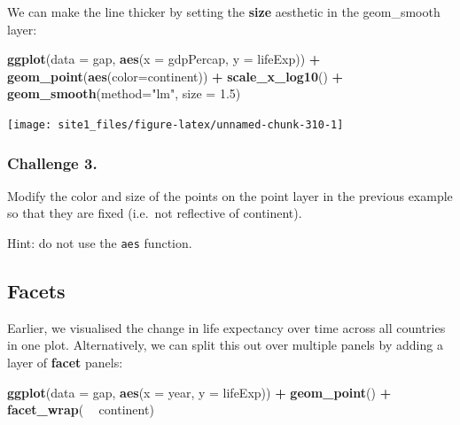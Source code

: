 \documentclass[]{book}
\newenvironment{Shaded}{\begin{snugshade}}{\end{snugshade}}
\newcommand{\DataTypeTok}[1]{\textcolor[rgb]{0.13,0.29,0.53}{#1}}
\newcommand{\FloatTok}[1]{\textcolor[rgb]{0.00,0.00,0.81}{#1}}
\newcommand{\KeywordTok}[1]{\textcolor[rgb]{0.13,0.29,0.53}{\textbf{#1}}}
\newcommand{\NormalTok}[1]{#1}
\newcommand{\OperatorTok}[1]{\textcolor[rgb]{0.81,0.36,0.00}{\textbf{#1}}}
\newcommand{\StringTok}[1]{\textcolor[rgb]{0.31,0.60,0.02}{#1}}
\begin{document}
We can make the line thicker by setting the \textbf{size} aesthetic in the geom\_smooth layer:

\begin{Shaded}
\begin{Highlighting}[]
\KeywordTok{ggplot}\NormalTok{(}\DataTypeTok{data =}\NormalTok{ gap, }\KeywordTok{aes}\NormalTok{(}\DataTypeTok{x =}\NormalTok{ gdpPercap, }\DataTypeTok{y =}\NormalTok{ lifeExp)) }\OperatorTok{+}\StringTok{ }
\StringTok{  }\KeywordTok{geom_point}\NormalTok{(}\KeywordTok{aes}\NormalTok{(}\DataTypeTok{color=}\NormalTok{continent)) }\OperatorTok{+}\StringTok{ }
\StringTok{  }\KeywordTok{scale_x_log10}\NormalTok{() }\OperatorTok{+}\StringTok{ }
\StringTok{  }\KeywordTok{geom_smooth}\NormalTok{(}\DataTypeTok{method=}\StringTok{"lm"}\NormalTok{, }\DataTypeTok{size =} \FloatTok{1.5}\NormalTok{)}
\end{Highlighting}
\end{Shaded}

\begin{center}\texttt{[image: site1\_files/figure-latex/unnamed-chunk-310-1]} \end{center}

\hypertarget{challenge-3.-5}{%
\subsubsection*{Challenge 3.}\label{challenge-3.-5}}

Modify the color and size of the points on the point layer in the previous example so that they are fixed (i.e.~not reflective of continent).

Hint: do not use the \texttt{aes} function.

\hypertarget{facets}{%
\subsection{Facets}\label{facets}}

Earlier, we visualised the change in life expectancy over time across all countries in one plot. Alternatively, we can split this out over multiple panels by adding a layer of \textbf{facet} panels:

\begin{Shaded}
\begin{Highlighting}[]
\KeywordTok{ggplot}\NormalTok{(}\DataTypeTok{data =}\NormalTok{ gap, }\KeywordTok{aes}\NormalTok{(}\DataTypeTok{x =}\NormalTok{ year, }\DataTypeTok{y =}\NormalTok{ lifeExp)) }\OperatorTok{+}
\StringTok{  }\KeywordTok{geom_point}\NormalTok{() }\OperatorTok{+}\StringTok{ }
\StringTok{  }\KeywordTok{facet_wrap}\NormalTok{( }\OperatorTok{~}\StringTok{ }\NormalTok{continent)}
\end{Highlighting}
\end{Shaded}
\end{document}
